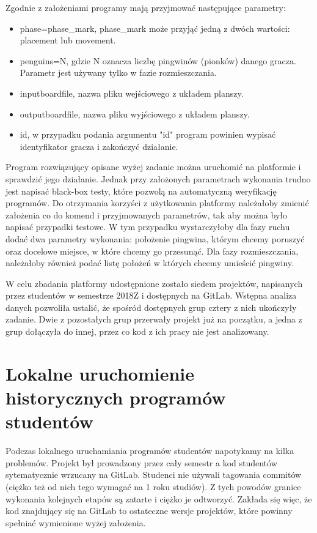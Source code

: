 Zgodnie z założeniami programy mają przyjmować następujące parametry:
\begin{itemize}
    \item phase=phase\_mark, phase\_mark może przyjąć jedną z dwóch wartości: placement lub movement.
    \item penguins=N, gdzie N oznacza liczbę pingwinów (pionków) danego gracza.
    Parametr jest używany tylko w fazie rozmieszczania.
    \item inputboardfile, nazwa pliku wejściowego z układem planszy.
    \item outputboardfile, nazwa pliku wyjściowego z układem planszy.
    \item id, w przypadku podania argumentu "id" program powinien wypisać identyfikator gracza i zakończyć działanie.
\end{itemize}

Program rozwiązujący opisane wyżej zadanie można uruchomić na platformie i sprawdzić jego działanie.
Jednak przy założonych parametrach wykonania trudno jest napisać black-box testy, które pozwolą na automatyczną weryfikację programów.
Do otrzymania korzyści z użytkowania platformy należałoby zmienić założenia co do komend i przyjmowanych parametrów, tak aby można było napisać przypadki testowe.
W tym przypadku wystarczyłoby dla fazy ruchu dodać dwa parametry wykonania: położenie pingwina, którym chcemy poruszyć oraz docelowe miejsce, w które chcemy go przesunąć.
Dla fazy rozmieszczania, należałoby również podać listę położeń w których chcemy umieścić pingwiny.

W celu zbadania platformy udostępnione zostało siedem projektów, napisanych przez studentów w semestrze 2018Z i dostępnych na GitLab.
Wstępna analiza danych pozwoliła ustalić, że spośród dostępnych grup cztery z nich ukończyły zadanie.
Dwie z pozostałych grup przerwały projekt już na początku, a jedna z grup dołączyła do innej, przez co kod z ich pracy nie jest analizowany.


\section{Lokalne uruchomienie historycznych programów studentów}

Podczas lokalnego uruchamiania programów studentów napotykamy na kilka problemów.
Projekt był prowadzony przez cały semestr a kod studentów sytematycznie wrzucany na GitLab.
Studenci nie używali tagowania commitów (ciężko też od nich tego wymagać na 1 roku studiów).
Z tych powodów granice wykonania kolejnych etapów są zatarte i ciężko je odtworzyć.
Zakłada się więc, że kod znajdujący się na GitLab to ostateczne wersje projektów, które powinny spełniać wymienione wyżej założenia.

